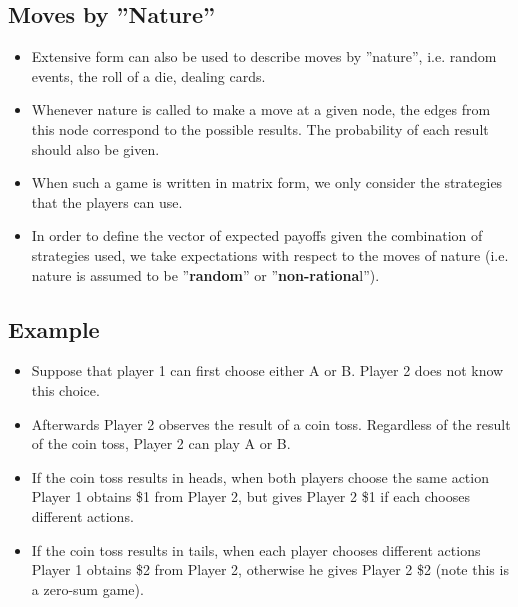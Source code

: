 \documentclass[]{report}
\begin{document}
\subsection{Moves by ”Nature”}
\begin{itemize}
	\item Extensive form can also be used to describe moves by ”nature”,
	i.e. random events, the roll of a die, dealing cards.
\item Whenever nature is called to make a move at a given node, the
	edges from this node correspond to the possible results. The
	probability of each result should also be given.
\item When such a game is written in matrix form, we only consider the
	strategies that the players can use. 
\item In order to define the vector of
	expected payoffs given the combination of strategies used, we
	take expectations with respect to the moves of nature (i.e. nature
	is assumed to be ”\textbf{random}” or ”\textbf{non-rationa}l”).
\end{itemize}



\subsection{Example}
\begin{itemize}
	\item Suppose that player 1 can first choose either A or B. Player 2 does
	not know this choice.
\item Afterwards Player 2 observes the result of a coin toss. Regardless
	of the result of the coin toss, Player 2 can play A or B.
\item If the coin toss results in heads, when both players choose the
	same action Player 1 obtains \$1 from Player 2, but gives Player 2
	\$1 if each chooses different actions. 
\item If the coin toss results in tails,
	when each player chooses different actions Player 1 obtains \$2
	from Player 2, otherwise he gives Player 2 \$2 (note this is a
	zero-sum game).
\end{itemize}
\end{document}

